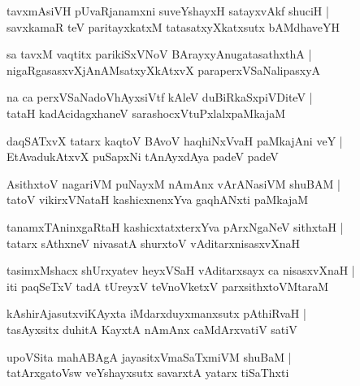 \documentclass[twoside,12pt,openright]{book}
\newcounter{shloka}[chapter]
\begin{document}
\begin{shloka}%
tavxmAsiVH pUvaRjanamxni suveYshayxH satayxvAkf shuciH |\\
savxkamaR teV paritayxkatxM tatasatxyXkatxsutx bAMdhaveYH
\end{shloka}

\begin{shloka}%
sa tavxM vaqtitx parikiSxVNoV BArayxyAnugatasathxthA |\\
nigaRgasasxvXjAnAMsatxyXkAtxvX paraperxVSaNalipasxyA
\end{shloka}

\begin{shloka}%
na ca perxVSaNadoVhAyxsiVtf kAleV duBiRkaSxpiVDiteV |\\
tataH kadAcidagxhaneV sarashocxVtuPxlalxpaMkajaM
\end{shloka}

\begin{shloka}%
daqSATxvX tatarx kaqtoV BAvoV haqhiNxVvaH paMkajAni veY |\\
EtAvadukAtxvX puSapxNi tAnAyxdAya padeV padeV
\end{shloka}

\begin{shloka}%
AsithxtoV nagariVM puNayxM nAmAnx vArANasiVM shuBAM |\\
tatoV vikirxVNataH kashicxnenxYva gaqhANxti paMkajaM
\end{shloka}

\begin{shloka}%
tanamxTAninxgaRtaH kashicxtatxterxYva pArxNgaNeV sithxtaH |\\
tatarx sAthxneV nivasatA shurxtoV vAditarxnisasxvXnaH 
\end{shloka}

\begin{shloka}%
tasimxMshacx shUrxyatev heyxVSaH vAditarxsayx ca nisasxvXnaH |\\
iti paqSeTxV tadA tUreyxV teVnoVketxV parxsithxtoVMtaraM
\end{shloka}

\begin{shloka}%
kAshirAjasutxviKAyxta iMdarxduyxmanxsutx pAthiRvaH |\\
tasAyxsitx duhitA KayxtA nAmAnx caMdArxvatiV satiV 
\end{shloka}

\begin{shloka}%
upoVSita mahABAgA jayasitxVmaSaTxmiVM shuBaM |\\
tatArxgatoVsw veYshayxsutx savarxtA yatarx tiSaThxti
\end{shloka}
\end{document}
